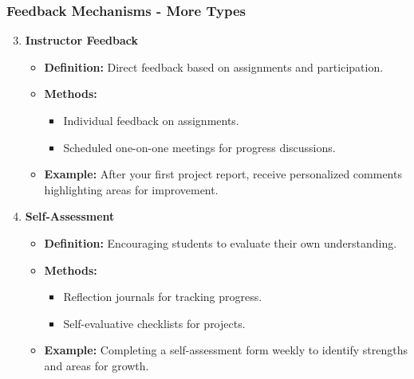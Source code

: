 \documentclass[aspectratio=169]{beamer}
\begin{document}
\begin{frame}[fragile]
    \frametitle{Feedback Mechanisms - More Types}
    \begin{enumerate}
        \setcounter{enumi}{2}
        \item \textbf{Instructor Feedback}
        \begin{itemize}
            \item \textbf{Definition:} Direct feedback based on assignments and participation.
            \item \textbf{Methods:}
            \begin{itemize}
                \item Individual feedback on assignments.
                \item Scheduled one-on-one meetings for progress discussions.
            \end{itemize}
            \item \textbf{Example:} After your first project report, receive personalized comments highlighting areas for improvement.
        \end{itemize}

        \item \textbf{Self-Assessment}
        \begin{itemize}
            \item \textbf{Definition:} Encouraging students to evaluate their own understanding.
            \item \textbf{Methods:}
            \begin{itemize}
                \item Reflection journals for tracking progress.
                \item Self-evaluative checklists for projects.
            \end{itemize}
            \item \textbf{Example:} Completing a self-assessment form weekly to identify strengths and areas for growth.
        \end{itemize}
    \end{enumerate}
\end{frame}
\end{document}
